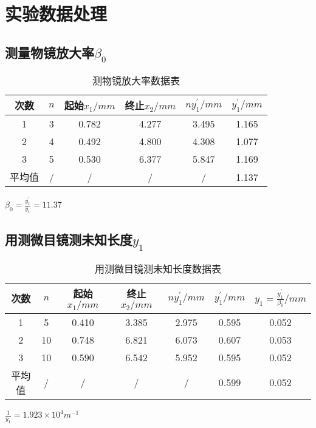 \documentclass[a4 paper,12pt]{article}
\begin{document}
\section{实验数据处理}

\subsection{测量物镜放大率$\beta_{0}$}
\begin{table}[H] 
	\caption{测物镜放大率数据表}
	\label{测物镜放大率数据表}
	\centering
		\begin{tabular}{cccccc}
			\toprule[0.5mm]
			次数 & $n $& 起始$x_{1}/mm $ & 终止$x_{2}/mm$&$ny_{1}^{\prime}/mm$&$y_{1}^{\prime}/mm$  \\
			\midrule
			1 & 3  & 0.782  & 4.277&3.495&1.165  \\
			2 & 4 & 0.492  & 4.800&4.308&1.077   \\
			3 & 5  & 0.530  & 6.377&5.847&1.169  \\
			平均值&/&/&/&/&1.137   \\
			\bottomrule[0.5mm]
			\end{tabular}
\end{table}
$\beta_{0}=\frac{y_{1}^{\prime}}{y_{1}}=11.37$\\

\subsection{用测微目镜测未知长度$y_{1}$}
\begin{table}[H] 
	\caption{用测微目镜测未知长度数据表}
	\label{用测微目镜测未知长度数据表}
	\centering
		\begin{tabular}{ccccccc}
			\toprule[0.5mm]
			次数 &$ n $& 起始$x_{1}/mm $ & 终止$x_{2}/mm$&$ny_{1}^{\prime}/mm$&$y_{1}^{\prime}/mm$&$y_{1}=\frac{y_{1}^{\prime}}{\beta_{0}}/mm$ \\
			\midrule
			1 & 5  & 0.410  & 3.385&2.975&0.595&0.052  \\
			2 & 10 & 0.748  & 6.821&6.073&0.607&0.053   \\
			3 & 10  & 0.590  & 6.542&5.952&0.595&0.052  \\
			平均值&/&/&/&/&0.599&0.052  \\
			\bottomrule[0.5mm]
	\end{tabular}
\end{table}
$\frac{1}{y_{1}}=1.923 \times 10^{4}  m^{-1}$\\
\end{document}

